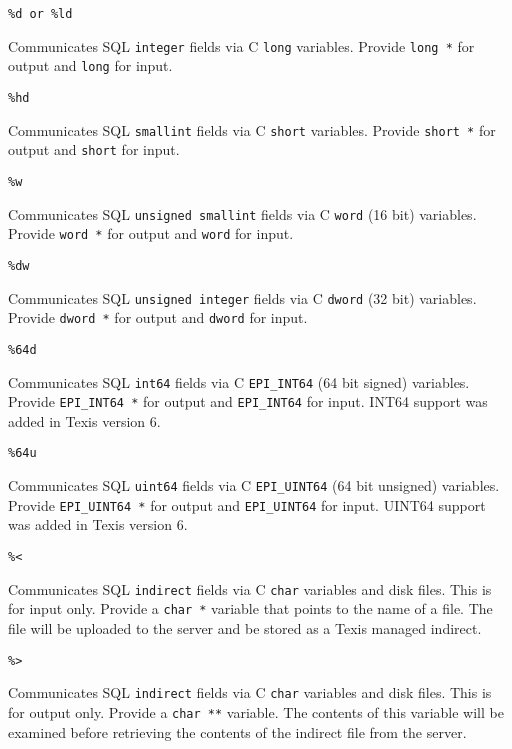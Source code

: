 \begin{verbatim}
%d or %ld
\end{verbatim}
Communicates SQL {\tt integer} fields via C {\tt long} variables. Provide
\verb`long *` for output and \verb`long` for input.

\begin{verbatim}
%hd
\end{verbatim}
Communicates SQL {\tt smallint} fields via C {\tt short} variables. Provide
\verb`short *` for output and \verb`short` for input.

\begin{verbatim}
%w
\end{verbatim}
Communicates SQL {\tt unsigned smallint} fields via C {\tt word} (16 bit) variables.
Provide \verb`word *` for output and \verb`word` for input.

\begin{verbatim}
%dw
\end{verbatim}
Communicates SQL {\tt unsigned integer} fields via C {\tt dword} (32 bit) variables.
Provide \verb`dword *` for output and \verb`dword` for input.

\begin{verbatim}
%64d
\end{verbatim}
Communicates SQL {\tt int64} fields via C {\tt EPI\_INT64} (64 bit signed) variables.
Provide \verb`EPI_INT64 *` for output and \verb`EPI_INT64` for input.
INT64 support was added in Texis version 6.

\begin{verbatim}
%64u
\end{verbatim}
Communicates SQL {\tt uint64} fields via C {\tt EPI\_UINT64} (64 bit unsigned) variables.
Provide \verb`EPI_UINT64 *` for output and \verb`EPI_UINT64` for input.
UINT64 support was added in Texis version 6.

\begin{verbatim}
%<
\end{verbatim}
Communicates SQL {\tt indirect} fields via C {\tt char} variables and disk files.
This is for input only. Provide a \verb`char *` variable that points
to the name of a file. The file will be uploaded to the server and
be stored as a Texis managed indirect.

\begin{verbatim}
%>
\end{verbatim}
Communicates SQL {\tt indirect} fields via C {\tt char} variables and disk files.
This is for output only.  Provide a \verb`char **` variable.  The
contents of this variable will be examined before retrieving the
contents of the indirect file from the server.

